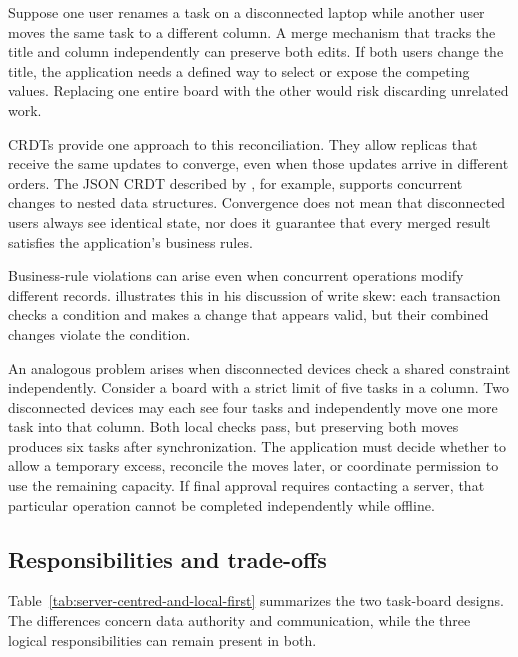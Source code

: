 Suppose one user renames a task on a disconnected laptop while another user moves the same task to a different column.
A merge mechanism that tracks the title and column independently can preserve both edits.
If both users change the title, the application needs a defined way to select or expose the competing values.
Replacing one entire board with the other would risk discarding unrelated work.

CRDTs provide one approach to this reconciliation.
They allow replicas that receive the same updates to converge, even when those updates arrive in different orders.
The JSON CRDT described by \textcite{json-crdt}, for example, supports concurrent changes to nested data structures.
Convergence does not mean that disconnected users always see identical state, nor does it guarantee that every merged result satisfies the application's business rules.

Business-rule violations can arise even when concurrent operations modify different records.
\textcite[Chapter~7]{designing-data-intensive-applications} illustrates this in his discussion of write skew: each transaction checks a condition and makes a change that appears valid, but their combined changes violate the condition.

An analogous problem arises when disconnected devices check a shared constraint independently.
Consider a board with a strict limit of five tasks in a column.
Two disconnected devices may each see four tasks and independently move one more task into that column.
Both local checks pass, but preserving both moves produces six tasks after synchronization.
The application must decide whether to allow a temporary excess, reconcile the moves later, or coordinate permission to use the remaining capacity.
If final approval requires contacting a server, that particular operation cannot be completed independently while offline.

\subsection{Responsibilities and trade-offs}

Table~\ref{tab:server-centred-and-local-first} summarizes the two task-board designs.
The differences concern data authority and communication, while the three logical responsibilities can remain present in both.

